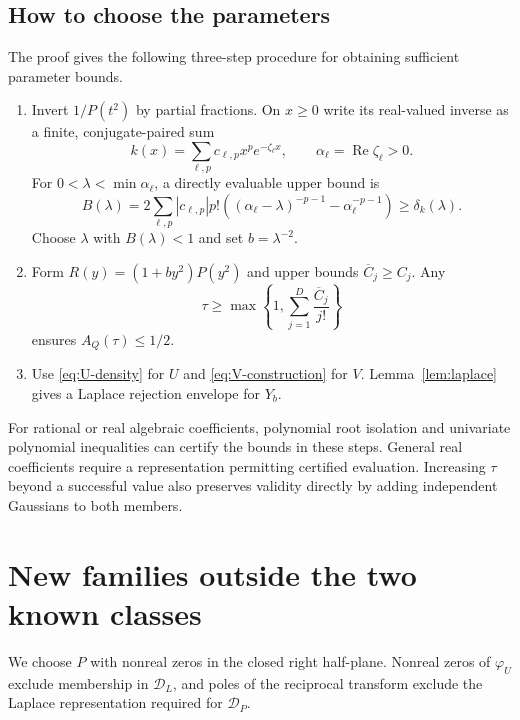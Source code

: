 \documentclass[11pt,twoside]{article}
\theoremstyle{journalplain}
\numberwithin{equation}{section}
\theoremstyle{journaldefinition}
\newcommand{\DL}{\mathcal D_L}
\newcommand{\DP}{\mathcal D_P}
\DeclareMathOperator{\Ree}{Re}
\begin{document}
\subsection{How to choose the parameters}
The proof gives the following three-step procedure for obtaining sufficient parameter bounds.
\begin{enumerate}[label=\arabic*.]
\item Invert $1/P(t^2)$ by partial fractions. On $x\ge0$ write its real-valued inverse as a finite, conjugate-paired sum
\[
 k(x)=\sum_{\ell,p}c_{\ell,p}x^p e^{-\zeta_\ell x},\qquad \alpha_\ell=\Ree\zeta_\ell>0.
\]
For $0<\lambda<\min\alpha_\ell$, a directly evaluable upper bound is
\begin{equation}\label{eq:B}
 B(\lambda)=2\sum_{\ell,p}|c_{\ell,p}|p!
 \left((\alpha_\ell-\lambda)^{-p-1}-\alpha_\ell^{-p-1}\right)
 \ge\delta_k(\lambda).
\end{equation}
Choose $\lambda$ with $B(\lambda)<1$ and set $b=\lambda^{-2}$.
\item Form $R(y)=(1+by^2)P(y^2)$ and upper bounds $\overline C_j\ge C_j$. Any
\begin{equation}\label{eq:tau-simple}
 \tau\ge\max\left\{1,\sum_{j=1}^D\frac{\overline C_j}{j!}\right\}
\end{equation}
ensures $A_Q(\tau)\le1/2$.
\item Use \eqref{eq:U-density} for $U$ and \eqref{eq:V-construction} for $V$. Lemma~\ref{lem:laplace} gives a Laplace rejection envelope for $Y_b$.
\end{enumerate}
For rational or real algebraic coefficients, polynomial root isolation and univariate polynomial inequalities can certify the bounds in these steps. General real coefficients require a representation permitting certified evaluation. Increasing $\tau$ beyond a successful value also preserves validity directly by adding independent Gaussians to both members.

\section{New families outside the two known classes}\label{sec:families}
We choose $P$ with nonreal zeros in the closed right half-plane. Nonreal zeros of $\varphi_U$ exclude membership in $\DL$, and poles of the reciprocal transform exclude the Laplace representation required for $\DP$.
\end{document}
